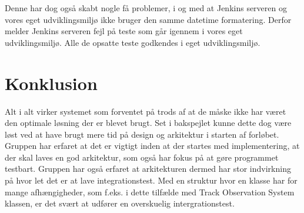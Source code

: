 Denne har dog også skabt nogle få problemer, i og med at Jenkins serveren og vores eget udviklingsmiljø ikke bruger den samme datetime formatering. Derfor melder Jenkins serveren fejl på teste som går igennem i vores eget udviklingsmiljø. Alle de opsatte teste godkendes i eget udviklingsmiljø.
\pagebreak
\section{Konklusion}
Alt i alt virker systemet som forventet på trods af at de måske ikke har været den optimale løsning der er blevet brugt. \tabularnewline
Set i bakspejlet kunne dette dog være løst ved at have brugt mere tid på design og arkitektur i starten af forløbet.  \tabularnewline
Gruppen har erfaret at det er vigtigt inden at der startes med implementering, at der skal laves en god arkitektur,
som også har fokus på at gøre programmet testbart. \tabularnewline
Gruppen har også erfaret at arkitekturen dermed har stor indvirkning på hvor let det er at lave integrationstest. Med en struktur hvor 
en klasse har for mange afhængigheder, som f.eks. i dette tilfælde med Track Observation System klassen, er det svært at udfører en overskuelig
intergrationstest.